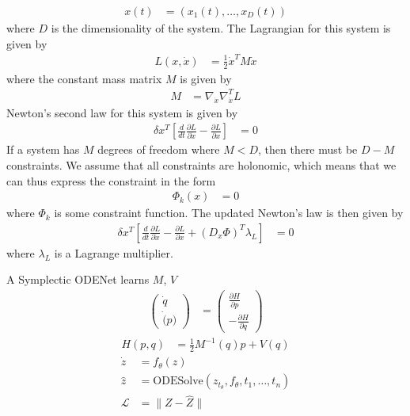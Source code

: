 \documentclass[book.tex]{subfiles}
\begin{document}
\begin{align}
    x(t) &= (x_1(t), \dotsc, x_D(t))
\end{align}
where $D$ is the dimensionality of the system. The Lagrangian for this system is given by
\begin{align}
    L(x, \dot{x}) &= \frac{1}{2}\dot{x}^T M \dot{x}
\end{align}
where the constant mass matrix $M$ is given by
\begin{align}
    M&= \nabla_{\dot{x}}\nabla_{\dot{x}}^TL
\end{align}
Newton's second law for this system is given by %
\begin{align}
\delta x^T \left [ \frac{d}{dt}\frac{\partial L}{\partial \dot{x}} - \frac{\partial L}{\partial x} \right ] &= 0
\end{align}
If a system has $M$ degrees of freedom where $M < D$, then there must be $D - M$ constraints. We assume that all constraints are holonomic, %
which means that we can thus express the constraint in the form
\begin{align}
\Phi_k(x) &= 0
\end{align}
where $\Phi_k$ is some constraint function. The updated Newton's law is then given by
\begin{align}
\delta x^T \left [ \frac{d}{dt}\frac{\partial L}{\partial \dot{x}} - \frac{\partial L}{\partial x}   + (D_x \Phi)^T \lambda_L\right ] &= 0
\end{align}
where $\lambda_L$ is a Lagrange multiplier.

A Symplectic ODENet learns $M$, $V$
\begin{align}
\begin{pmatrix}
    \dot{q} \\
    \dot(p)
\end{pmatrix} &= \begin{pmatrix}
    \frac{\partial H}{\partial p} \\
    -\frac{\partial H}{\partial q}
\end{pmatrix}
\end{align}
\begin{align}
H(p, q) &= \frac{1}{2}M^{-1}(q)p + V(q)
\end{align}
\begin{align}
\dot{z} &= f_\theta(z) \\
\hat{z} &= \textrm{ODESolve}(z_{t_\theta}, f_\theta, t_1,\dotsc,t_n) \\
\mathcal{L} &= \|Z - \hat{Z} \|
\end{align}
\end{document}
